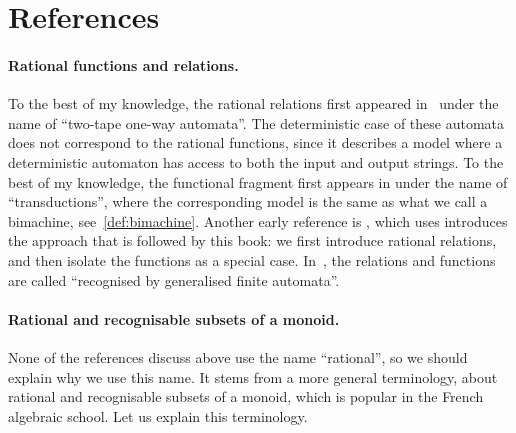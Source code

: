 \section{References}
\label{sec:rational-bib}

\paragraph*{Rational functions and relations.}
To the best of my knowledge, the rational relations first appeared  in~\cite[Definition 15]{RabinScott59}  under the name of ``two-tape one-way automata''. The deterministic case of these automata does not correspond to the rational functions, since it describes a model where a deterministic automaton has access to both the input and output strings. To the best of my knowledge, the functional fragment first appears in \cite[Section II]{schutzenberger1961} under the name of ``transductions'', where the corresponding model is the same as what we call a bimachine, see~\cref{def:bimachine}.   Another early reference is 
\cite{elgotMezei1965}, which uses introduces the approach that is followed by this book: we first introduce rational relations, and then isolate the functions as a special case. In~\cite{elgotMezei1965}, the relations and functions are called ``recognised by generalised finite automata''. 


\paragraph*{Rational and recognisable subsets of a monoid.} None of the references discuss above use the name ``rational'', so we should explain why we use this name. It stems from a more general terminology, about rational and recognisable subsets of a monoid, which is popular in the French algebraic school. Let us explain this terminology. 

